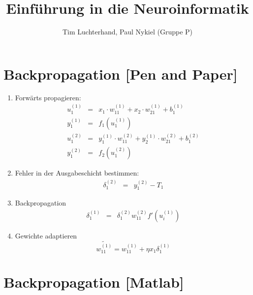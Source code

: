\documentclass[DIN, pagenumber=false, fontsize=11pt, parskip=half]{scrartcl}
\title{Einführung in die Neuroinformatik}
\author{Tim Luchterhand, Paul Nykiel (Gruppe P)}
\begin{document}
    \maketitle
    \section{Backpropagation [Pen and Paper]}
    \begin{enumerate}
        \item Forwärts propagieren:
            \begin{eqnarray*}
                u_1^{(1)} &=& x_1 \cdot w_{11}^{(1)} + x_2 \cdot w_{21}^{(1)} + b_1^{(1)}\\
                y_1^{(1)} &=& f_1(u_1^{(1)}) \\
                u_1^{(2)} &=& y_1^{(1)} \cdot w_{11}^{(2)} + y_2^{(1)} \cdot w_{21}^{(2)} + b_1^{(2)}\\
                y_1^{(2)} &=& f_2(u_1^{(2)}) 
            \end{eqnarray*}
        \item Fehler in der Ausgabeschicht bestimmen:
            \begin{eqnarray*}
                \delta_1^{(2)} &=& y_1^{(2)} - T_1
            \end{eqnarray*}
        \item Backpropagation
            \begin{eqnarray*}
                \delta_1^{(1)} &=& \delta_1^{(2)} w_{11}^{(2)}f'\left(u_i^{(1)}\right)
            \end{eqnarray*}
        \item Gewichte adaptieren
            \begin{equation*}
                \tilde{w_{11}^{(1)}} =  w_{11}^{(1)} + \eta x_1 \delta_1^{(1)}
            \end{equation*}
    \end{enumerate}
    
    \section{Backpropagation [Matlab]}
\end{document}
